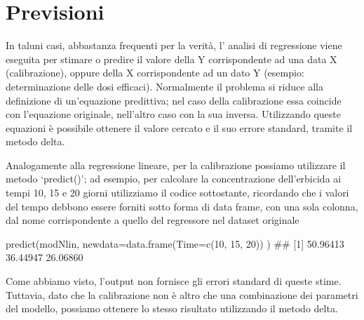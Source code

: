 \documentclass[a4paper,12pt,oneside]{book}
\newenvironment{Shaded}{\begin{snugshade}}{\end{snugshade}}
\newcommand{\DecValTok}[1]{#1}
\newcommand{\DocumentationTok}[1]{#1}
\newcommand{\FunctionTok}[1]{#1}
\newcommand{\AttributeTok}[1]{#1}
\newcommand{\NormalTok}[1]{#1}
\begin{document}
\hypertarget{previsioni-1}{%
\section{Previsioni}\label{previsioni-1}}

In taluni casi, abbastanza frequenti per la verità, l' analisi di regressione viene eseguita per stimare o predire il valore della Y corrispondente ad una data X (calibrazione), oppure della X corrispondente ad un dato Y (esempio: determinazione delle dosi efficaci). Normalmente il problema si riduce alla definizione di un'equazione predittiva; nel caso della calibrazione essa coincide con l'equazione originale, nell'altro caso con la sua inversa. Utilizzando queste equazioni è possibile ottenere il valore cercato e il suo errore standard, tramite il metodo delta.

Analogamente alla regressione lineare, per la calibrazione possiamo utilizzare il metodo `predict()'; ad esempio, per calcolare la concentrazione dell'erbicida ai tempi 10, 15 e 20 giorni utilizziamo il codice sottostante, ricordando che i valori del tempo debbono essere forniti sotto forma di data frame, con una sola colonna, dal nome corrispondente a quello del regressore nel dataset originale

\begin{Shaded}
\begin{Highlighting}[]
\FunctionTok{predict}\NormalTok{(modNlin, }\AttributeTok{newdata=}\FunctionTok{data.frame}\NormalTok{(}\AttributeTok{Time=}\FunctionTok{c}\NormalTok{(}\DecValTok{10}\NormalTok{, }\DecValTok{15}\NormalTok{, }\DecValTok{20}\NormalTok{)) )}
\DocumentationTok{\#\# [1] 50.96413 36.44947 26.06860}
\end{Highlighting}
\end{Shaded}

Come abbiamo visto, l'output non fornisce gli errori standard di queste stime. Tuttavia, dato che la calibrazione non è altro che una combinazione dei parametri del modello, possiamo ottenere lo stesso risultato utilizzando il metodo delta.
\end{document}
